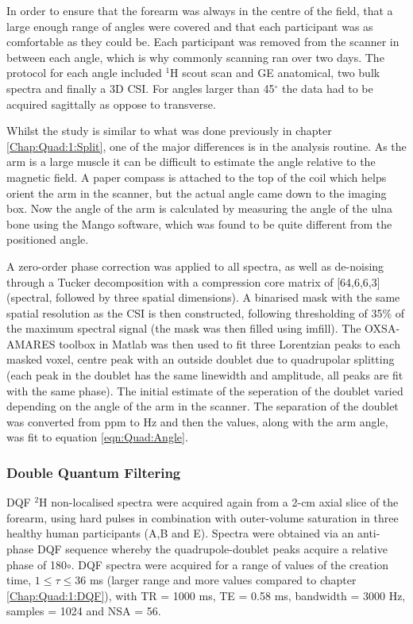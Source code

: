 \documentclass[class=article, crop=false]{standalone}
\begin{document}
In order to ensure that the forearm was always in the centre of the field, that a large enough range of angles were covered and that each participant was as comfortable as they could be. Each participant was removed from the scanner in between each angle, which is why commonly scanning ran over two days. The protocol for each angle included $^1$H scout scan and GE anatomical, two bulk spectra and finally a 3D CSI. For angles larger than 45$^\circ$ the data had to be acquired sagittally as oppose to transverse.

Whilst the study is similar to what was done previously in chapter \ref{Chap:Quad:1:Split}, one of the major differences is in the analysis routine. As the arm is a large muscle it can be difficult to estimate the angle relative to the magnetic field. A paper compass is attached to the top of the coil which helps orient the arm in the scanner, but the actual angle came down to the imaging box. Now the angle of the arm is calculated by measuring the angle of the ulna bone using the Mango software, which was found to be quite different from the positioned angle.

A zero-order phase correction was applied to all spectra, as well as de-noising through a Tucker decomposition \cite{Bader2007EfficientTensors} with a compression core matrix of [64,6,6,3] (spectral, followed by three spatial dimensions). A binarised mask with the same spatial resolution as the CSI is then constructed, following thresholding of 35\% of the maximum spectral signal (the mask was then filled using imfill). The OXSA-AMARES \cite{Purvis2017OXSA:MATLAB} toolbox in Matlab was then used to fit three Lorentzian peaks to each masked voxel, centre peak with an outside doublet due to quadrupolar splitting (each peak in the doublet has the same linewidth and amplitude, all peaks are fit with the same phase). The initial estimate of the seperation of the doublet varied depending on the angle of the arm in the scanner. The separation of the doublet was converted from ppm to Hz and then the values, along with the arm angle, was fit to equation \ref{eqn:Quad:Angle}.

\subsubsection{Double Quantum Filtering}

DQF $^2$H non-localised spectra were acquired again from a 2-cm axial slice of the forearm, using hard pulses in combination with outer-volume saturation in three healthy human participants (A,B and E). Spectra were obtained via an anti-phase DQF sequence \cite{Sharf1995DetectionNMR-Spectroscopy} whereby the quadrupole-doublet peaks acquire a relative phase of 180$\circ$. DQF spectra were acquired for a range of values of the creation time, $1\leq\tau\leq36$ ms (larger range and more values compared to chapter \ref{Chap:Quad:1:DQF}), with TR = 1000 ms, TE = 0.58 ms, bandwidth = 3000 Hz, samples = 1024 and NSA = 56.
\end{document}
